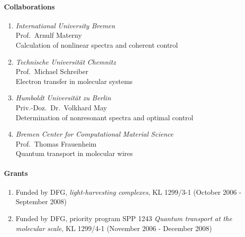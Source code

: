 \paragraph{Collaborations}
\begin{enumerate}
\item {\sl International University Bremen} \\ Prof.\ Arnulf Materny
  \\ Calculation of nonlinear spectra and coherent control
\item {\sl Technische Universit\"at Chemnitz} \\ Prof.\ Michael Schreiber
  \\ Electron transfer in molecular systems
\item {\sl Humboldt Universit\"at zu Berlin}
  \\ Priv.-Doz.\ Dr.\ Volkhard May
\\ Determination of nonresonant spectra and optimal control
\item {\sl Bremen Center for Computational Material Science}
  \\ Prof.\ Thomas Frauenheim \\ Quantum transport in molecular wires
\end{enumerate}


\paragraph{Grants}
\begin{enumerate}
\item Funded by DFG, \emph{light-harvesting complexes}, KL
  1299/3-1 (October 2006 - September 2008)
\item Funded by DFG, priority program SPP 1243 \emph{Quantum transport
  at the molecular scale}, KL 1299/4-1 (November 2006 - December
  2008)
\end{enumerate}

\nocite{profkleinekathoeferwela05a}
\nocite{profkleinekathoeferschr05a}
\nocite{profkleinekathoeferwela05b}
\nocite{profkleinekathoeferklei06a}
\nocite{profkleinekathoeferklei06b}
\nocite{profkleinekathoeferklei06c}



